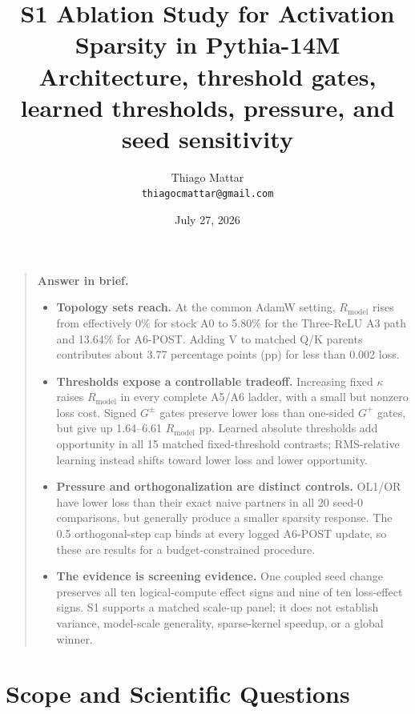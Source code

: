 \documentclass[10pt]{article}
\title{\textbf{S1 Ablation Study for Activation Sparsity in Pythia-14M}\\
\large Architecture, threshold gates, learned thresholds, pressure, and seed sensitivity}
\author{Thiago Mattar\\\texttt{thiagocmattar@gmail.com}}
\date{July 27, 2026}
\newcommand{\Rmodel}{R_{\mathrm{model}}}
\begin{document}
\maketitle

\begin{quote}
\textbf{Answer in brief.}
\begin{itemize}
  \item \textbf{Topology sets reach.} At the common AdamW setting,
  \(\Rmodel\) rises from effectively 0\% for stock A0 to 5.80\% for the
  Three-ReLU A3 path and 13.64\% for A6-POST. Adding V to matched Q/K parents
  contributes about 3.77 percentage points (pp) for less than 0.002 loss.
  \item \textbf{Thresholds expose a controllable tradeoff.} Increasing fixed
  \(\kappa\) raises \(\Rmodel\) in every complete A5/A6 ladder, with a small
  but nonzero loss cost. Signed \(G^\pm\) gates preserve lower loss than
  one-sided \(G^+\) gates, but give up 1.64--6.61 \(\Rmodel\) pp. Learned
  absolute thresholds add opportunity in all 15 matched fixed-threshold
  contrasts; RMS-relative learning instead shifts toward lower loss and lower
  opportunity.
  \item \textbf{Pressure and orthogonalization are distinct controls.}
  OL1/OR have lower loss than their exact naive partners in all 20 seed-0
  comparisons, but generally produce a smaller sparsity response. The 0.5
  orthogonal-step cap binds at every logged A6-POST update, so these are
  results for a budget-constrained procedure.
  \item \textbf{The evidence is screening evidence.} One coupled seed change
  preserves all ten logical-compute effect signs and nine of ten loss-effect
  signs. S1 supports a matched scale-up panel; it does not establish variance,
  model-scale generality, sparse-kernel speedup, or a global winner.
\end{itemize}
\end{quote}

\section{Scope and Scientific Questions}
\end{document}

